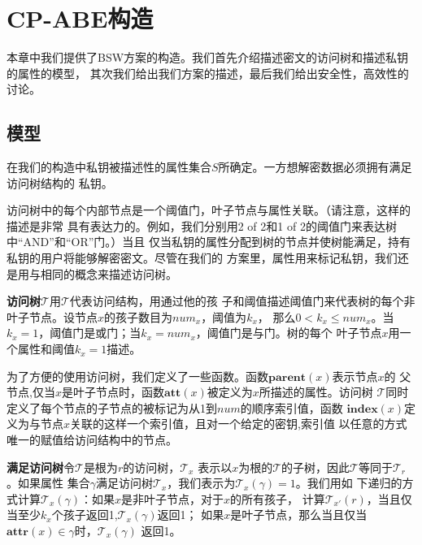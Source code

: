 \chapter{CP-ABE构造}
本章中我们提供了BSW方案的构造。我们首先介绍描述密文的访问树和描述私钥的属性的模型，
其次我们给出我们方案的描述，最后我们给出安全性，高效性的讨论。
\section{模型}
在我们的构造中私钥被描述性的属性集合$S$所确定。一方想解密数据必须拥有满足访问树结构的
私钥。\par
访问树中的每个内部节点是一个阈值门，叶子节点与属性关联。（请注意，这样的描述是非常
具有表达力的。例如，我们分别用2 of 2和1 of 2的阈值门来表达树中“AND”和“OR”门。）当且
仅当私钥的属性分配到树的节点并使树能满足，持有私钥的用户将能够解密密文。尽管在我们的
方案里，属性用来标记私钥，我们还是用与\cite{GPSW:ABE}相同的概念来描述访问树。\par
\vspace{5mm}
\noindent\textbf{访问树$\mathcal{T}$}\quad 用$\mathcal{T}$代表访问结构，用通过他的孩
子和阈值描述阈值门来代表树的每个非叶子节点。设节点$x$的孩子数目为$num_x$，阈值为$k_x$，
那么$0<k_x\leq num_x$。当$k_x=1$，阈值门是或门；当$k_x=num_x$，阈值门是与门。树的每个
叶子节点$x$用一个属性和阈值$k_x=1$描述。\par
为了方便的使用访问树，我们定义了一些函数。函数$\textbf{parent}(x)$表示节点$x$的
父节点,仅当$x$是叶子节点时，函数$\textbf{att}(x)$被定义为$x$所描述的属性。访问树
$\mathcal{T}$同时定义了每个节点的子节点的被标记为从1到$num$的顺序索引值，函数
$\textbf{index}(x)$定义为与节点$x$关联的这样一个索引值，且对一个给定的密钥,索引值
以任意的方式唯一的赋值给访问结构中的节点。\par
\vspace{5mm}
\noindent\textbf{满足访问树}\quad 令$\mathcal{T}$是根为$r$的访问树，$\mathcal{T}_x$
表示以$x$为根的$\mathcal{T}$的子树，因此$\mathcal{T}$等同于$\mathcal{T}_r$。如果属性
集合$\gamma$满足访问树$\mathcal{T}_x$，我们表示为$\mathcal{T}_x(\gamma)=1$。我们用如
下递归的方式计算$\mathcal{T}_x(\gamma)$：如果$x$是非叶子节点，对于$x$的所有孩子，
计算$\mathcal{T}_{x'}(r)$，当且仅当至少$k_x$个孩子返回1,$\mathcal{T}_x(\gamma)$返回1；
如果$x$是叶子节点，那么当且仅当$\textbf{attr}(x)\in \gamma$时，$\mathcal{T}_x(\gamma)$
返回1。
